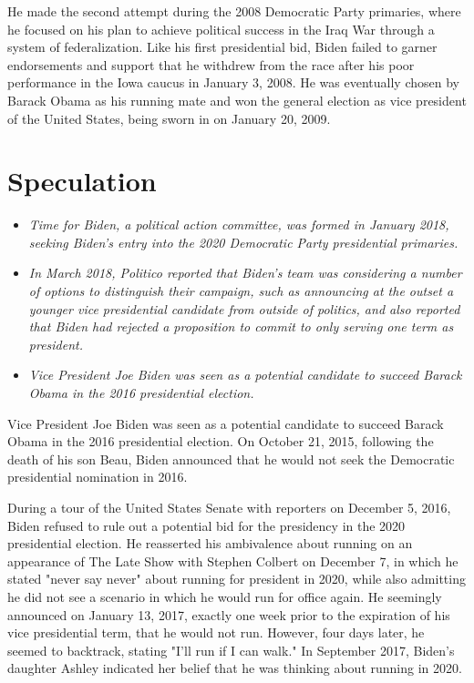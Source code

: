 He made the second attempt during the 2008 Democratic Party primaries,
where he focused on his plan to achieve political success in the Iraq
War through a system of federalization. Like his first presidential bid,
Biden failed to garner endorsements and support that he withdrew from
the race after his poor performance in the Iowa caucus in January 3,
2008. He was eventually chosen by Barack Obama as his running mate and
won the general election as vice president of the United States, being
sworn in on January 20, 2009.

\section{Speculation}\label{speculation}

\begin{itemize}
\item
  \emph{Time for Biden, a political action committee, was formed in
  January 2018, seeking Biden's entry into the 2020 Democratic Party
  presidential primaries.}
\item
  \emph{In March 2018, Politico reported that Biden's team was
  considering a number of options to distinguish their campaign, such as
  announcing at the outset a younger vice presidential candidate from
  outside of politics, and also reported that Biden had rejected a
  proposition to commit to only serving one term as president.}
\item
  \emph{Vice President Joe Biden was seen as a potential candidate to
  succeed Barack Obama in the 2016 presidential election.}
\end{itemize}

Vice President Joe Biden was seen as a potential candidate to succeed
Barack Obama in the 2016 presidential election. On October 21, 2015,
following the death of his son Beau, Biden announced that he would not
seek the Democratic presidential nomination in 2016.

During a tour of the United States Senate with reporters on December 5,
2016, Biden refused to rule out a potential bid for the presidency in
the 2020 presidential election. He reasserted his ambivalence about
running on an appearance of The Late Show with Stephen Colbert on
December 7, in which he stated "never say never" about running for
president in 2020, while also admitting he did not see a scenario in
which he would run for office again. He seemingly announced on January
13, 2017, exactly one week prior to the expiration of his vice
presidential term, that he would not run. However, four days later, he
seemed to backtrack, stating "I'll run if I can walk." In September
2017, Biden's daughter Ashley indicated her belief that he was thinking
about running in 2020.

